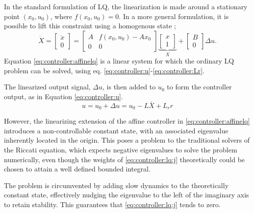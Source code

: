     In the standard formulation of LQ, the linearization is made
    around a stationary point $(x_{0},u_{0})$, where $f(x_{0},u_{0}) = 0$.
    In a more general formulation, it is possible to lift this constraint
    using a homogenous state \citep{Rantzer99piecewiselinear};
    \begin{equation}
    \label{eq:controller:affinelq}
        \dot{X} = \left[
        \begin{array}{c}
            \dot{x} \\
            0
        \end{array}\right] =
        \left[
        \begin{array}{cc}
            A & f(x_{0},u_{0})-Ax_{0} \\
            0 & 0
        \end{array}\right]
        \underbrace{\left[
        \begin{array}{c}
            x \\
            1
        \end{array}\right]}_{X}
        +
        \left[
        \begin{array}{c}
            B \\
            0
        \end{array}\right]
        \Delta u.
    \end{equation}
    Equation \ref{eq:controller:affinelq} is a linear system for which
    the ordinary LQ problem can be solved, using eq.
    \eqref{eq:controller:u}-\eqref{eq:controller:Lr}.

    The linearized output signal, $\Delta u$, is then added
    to $u_{0}$ to form the controller output, as in Equation \eqref{eq:controller:u}.
    \begin{equation}
    \label{eq:controller:u}
        u = u_{0} + \Delta u = u_{0} - L\bar{X} + L_{r}r
    \end{equation}

    However, the linearizing extension of the affine controller in \eqref{eq:controller:affinelq}
    introduces a non-controllable constant state, with
    an associated eigenvalue inherently located in the
    origin.
    This poses a problem to the traditional solvers of the Riccati equation, which
    expects negative eigenvalues to solve the problem numerically, even though
    the weights of \eqref{eq:controller:lq:j} theoretically could be chosen to
    attain a well defined bounded integral.

    The problem is circumvented by adding slow dynamics to the theoretically
    constant state, effectively nudging the eigenvalue to the left of the
    imaginary axis to retain stability.
    This guarantees that \eqref{eq:controller:lq:j} tends to zero.

